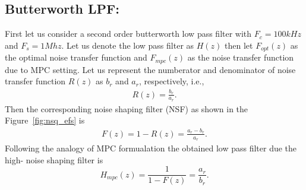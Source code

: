 \documentclass[a4paper]{article}
\begin{document}
\subsection*{Butterworth LPF:}
First let us consider a second order butterworth low pass filter with $F_c = 100 \mathit{kHz}$  and $F_s = 1 \mathit{Mhz}$. Let us denote the low pass filter as $H(z)$ then let $F_{opt}(z)$ as the optimal noise transfer function and $F_{mpc}(z)$ as the noise transfer function due to MPC setting. Let us represent the numberator and denominator of noise transfer function $R(z)$ as $b_{r}$ and $a_{r}$, respectively, i.e., 
\begin{align}
	R(z) = \frac{b_{r}}{a_{r}}.
\end{align}
Then the corresponding noise shaping filter (NSF) as shown in the Figure~\ref{fig:nsq_efs}  is 
\begin{align}	
F(z)  = 1- R(z)= \frac{a_{r}- b_{r}}{a_{r}}.
\end{align}
Following the analogy of MPC formualation the obtained low pass filter due the high- noise shaping filter is 
\begin{equation}
	H_{mpc}(z) = \frac{1}{1-F(z)} =  \frac{a_{r}}{b_{r}}.
\end{equation}  
\end{document}
